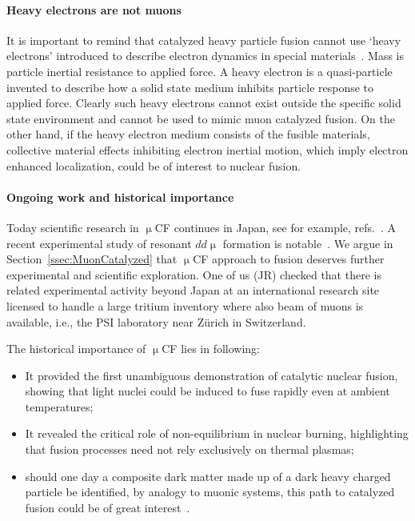 \documentclass[particles,article,accept,pdftex,moreauthors]{Definitions/mdpi}
\begin{document}
\paragraph*{\bf Heavy electrons are not muons}
It is important to remind that catalyzed heavy particle fusion cannot use `heavy electrons' introduced to describe electron dynamics in special materials~\cite{Kuramoto:2000}. Mass is particle inertial resistance to applied force. A heavy electron is a quasi-particle invented to describe how a solid state medium inhibits particle response to applied force. Clearly such heavy electrons cannot exist outside the specific solid state environment and cannot be used to mimic muon catalyzed fusion. On the other hand, if the heavy electron medium consists of the fusible materials, collective material effects inhibiting electron inertial motion, which imply electron enhanced localization, could be of interest to nuclear fusion.

\paragraph*{\bf Ongoing work and historical importance}
Today scientific research in $\upmu$CF continues in Japan, see for example, refs.~\cite{Kamimura:2021msf,Yamashita:2022rtu}. A recent experimental study of resonant $dd\upmu$ formation is notable~\cite{Toyama:2026}. We argue in Section~\ref{ssec:MuonCatalyzed} that $\upmu$CF approach to fusion deserves further experimental and scientific exploration. One of us (JR) checked that there is related experimental activity beyond Japan at an international research site  licensed to handle a large tritium inventory where also beam of muons is available, i.e., the PSI laboratory near Z\"urich in Switzerland.
 
The historical importance of $\upmu$CF lies in following:
\begin{itemize}
 \item[(a)] It provided the first unambiguous demonstration of catalytic nuclear fusion, showing that light nuclei could be induced to fuse rapidly even at ambient temperatures; 
 \item[(b)] It revealed the critical role of non-equilibrium in nuclear burning, highlighting that fusion processes need not rely exclusively on thermal plasmas;
 \item[(c)] should one day a composite dark matter made up of a dark heavy charged particle be identified, by analogy to muonic systems, this path to catalyzed fusion could be of great interest~\cite{Rafelski:1989pz}.
\end{itemize}
\end{document}
